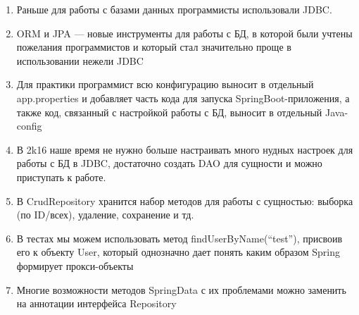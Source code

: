 \begin{enumerate}
	\setlength\itemsep{0em}
	\item  Раньше для работы с базами данных программисты использовали JDBC. 
	\item  ORM и JPA — новые инструменты для работы с БД, в которой были учтены пожелания программистов и который стал значительно проще в использовании нежели JDBC
	\item Для практики программист всю конфигурацию выносит в отдельный app.properties и добавляет часть кода для запуска SpringBoot-приложения, а также код, связанный с настройкой работы с БД, выносит в отдельный Java-config 
	\item В 2k16 наше время не нужно больше настраивать много нудных настроек для работы с БД в JDBC, достаточно создать DAO для сущности и можно приступать к работе. 
	\item В CrudRepository хранится набор методов для работы с сущностью: выборка (по ID/всех), удаление, сохранение и тд.
	\item В тестах мы можем использовать метод findUserByName(“test”), присвоив его к объекту User, который однозначно дает понять каким образом Spring формирует прокси-объекты 
	\item Многие возможности методов SpringData с их проблемами можно заменить на аннотации интерфейса Repository 
\end{enumerate}